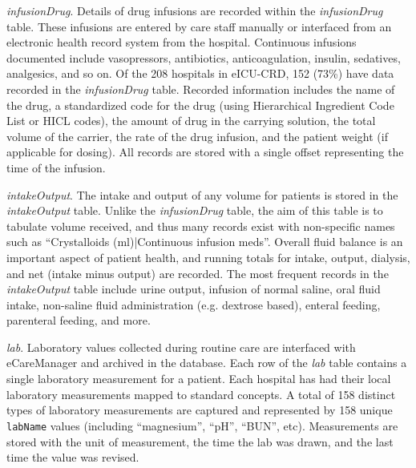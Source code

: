 \documentclass[english]{article}
\newcommand{\colname}[1]{\texttt{#1}}
\newcommand{\tblname}[1]{\emph{#1}}
\begin{document}
\tblname{infusionDrug}. Details of drug infusions are recorded within the \tblname{infusionDrug} table. These infusions are entered by care staff manually or interfaced from an electronic health record system from the hospital. Continuous infusions documented include vasopressors, antibiotics, anticoagulation, insulin, sedatives, analgesics, and so on. Of the 208 hospitals in eICU-CRD, 152 (73\%) have data recorded in the \tblname{infusionDrug} table. Recorded information includes the name of the drug, a standardized code for the drug (using Hierarchical Ingredient Code List or HICL codes), the amount of drug in the carrying solution, the total volume of the carrier, the rate of the drug infusion, and the patient weight (if applicable for dosing). All records are stored with a single offset representing the time of the infusion.

\tblname{intakeOutput}. The intake and output of any volume for patients is stored in the \tblname{intakeOutput} table. Unlike the \tblname{infusionDrug} table, the aim of this table is to tabulate volume received, and thus many records exist with non-specific names such as ``Crystalloids (ml)|Continuous infusion meds''.
Overall fluid balance is an important aspect of patient health, and running totals for intake, output, dialysis, and net (intake minus output) are recorded. The most frequent records in the \tblname{intakeOutput} table include urine output, infusion of normal saline, oral fluid intake, non-saline fluid administration (e.g. dextrose based), enteral feeding, parenteral feeding, and more.

\tblname{lab}. Laboratory values collected during routine care are interfaced with
eCareManager and archived in the database.
Each row of the \tblname{lab} table contains a single laboratory measurement for a patient.
Each hospital has had their local laboratory measurements mapped to standard concepts.
A total of 158 distinct types of laboratory measurements are captured and represented by 158 unique \colname{labName} values (including ``magnesium'', ``pH'', ``BUN'', etc).
Measurements are stored with the unit of measurement, the time the lab was drawn,
and the last time the value was revised.
\end{document}
